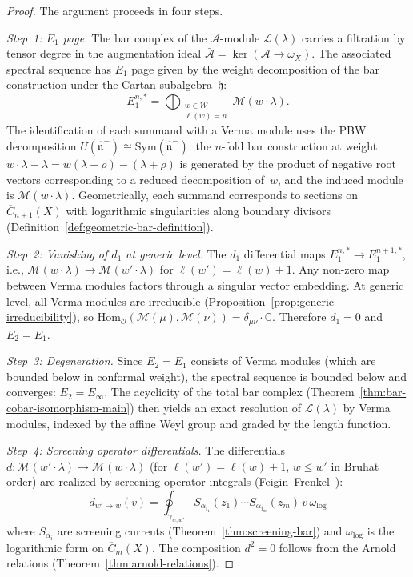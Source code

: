 \begin{proof}
The argument proceeds in four steps.

\emph{Step~1: $E_1$ page.}
The bar complex of the $\mathcal{A}$-module
$\mathcal{L}(\lambda)$ carries a filtration by tensor degree
in the augmentation ideal
$\bar{\mathcal{A}} = \ker(\mathcal{A} \to \omega_X)$.  The
associated spectral sequence has $E_1$ page given by the weight
decomposition of the bar construction under the Cartan
subalgebra~$\mathfrak{h}$:
\[
E_1^{n,*} = \bigoplus_{\substack{w \in \mathcal{W} \\
\ell(w) = n}} \mathcal{M}(w \cdot \lambda).
\]
The identification of each summand with a Verma module uses the
PBW decomposition
$U(\widehat{\mathfrak{n}}^-) \cong
\mathrm{Sym}(\widehat{\mathfrak{n}}^-)$:
the $n$-fold bar construction at weight
$w \cdot \lambda - \lambda = w(\lambda + \rho) - (\lambda + \rho)$
is generated by the product of negative root vectors corresponding
to a reduced decomposition of~$w$, and the induced module is
$\mathcal{M}(w \cdot \lambda)$.  Geometrically, each summand
corresponds to sections on $\overline{C}_{n+1}(X)$ with logarithmic
singularities along boundary divisors
(Definition~\ref{def:geometric-bar-definition}).

\emph{Step~2: Vanishing of $d_1$ at generic level.}
The $d_1$ differential maps
$E_1^{n,*} \to E_1^{n+1,*}$, i.e.,
$\mathcal{M}(w \cdot \lambda) \to \mathcal{M}(w' \cdot \lambda)$
for $\ell(w') = \ell(w) + 1$.  Any non-zero map between Verma
modules factors through a singular vector embedding.  At generic
level, all Verma modules are irreducible
(Proposition~\ref{prop:generic-irreducibility}), so
$\mathrm{Hom}_{\mathcal{O}}(\mathcal{M}(\mu),
\mathcal{M}(\nu)) = \delta_{\mu\nu} \cdot \mathbb{C}$.
Therefore $d_1 = 0$ and $E_2 = E_1$.

\emph{Step~3: Degeneration.}
Since $E_2 = E_1$ consists of Verma modules (which are
bounded below in conformal weight), the spectral sequence is
bounded below and converges: $E_2 = E_\infty$.
The acyclicity of the total bar complex
(Theorem~\ref{thm:bar-cobar-isomorphism-main})
then yields an exact resolution of $\mathcal{L}(\lambda)$ by
Verma modules, indexed by the affine Weyl group and graded
by the length function.

\emph{Step~4: Screening operator differentials.}
The differentials
$d\colon \mathcal{M}(w' \cdot \lambda) \to
\mathcal{M}(w \cdot \lambda)$
(for $\ell(w') = \ell(w) + 1$, $w \leq w'$ in Bruhat order)
are realized by screening operator integrals
(Feigin--Frenkel~\cite{FF}):
\[
d_{w' \to w}(v) = \oint_{\gamma_{w,w'}}
S_{\alpha_{i_1}}(z_1) \cdots S_{\alpha_{i_m}}(z_m)\,
v\, \omega_{\log}
\]
where $S_{\alpha_i}$ are screening currents
(Theorem~\ref{thm:screening-bar}) and
$\omega_{\log}$ is the logarithmic form on $\overline{C}_m(X)$.
The composition $d^2 = 0$ follows from the Arnold relations
(Theorem~\ref{thm:arnold-relations}).
\end{proof}

